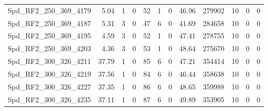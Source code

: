 \begin{longtable}[c]{@{}lrrrrrrrrrrr@{}}
Spd\_RF2\_250\_369\_4179      & 5.04                   & 1                       & 0                       & 52                     & 1                       & 0                       & 46.96                   & 279902                   & 10                       & 0                        & 0                        \\
Spd\_RF2\_250\_369\_4187      & 5.31                   & 3                       & 0                       & 47                     & 6                       & 0                       & 41.69                   & 284658                   & 10                       & 0                        & 0                        \\
Spd\_RF2\_250\_369\_4195      & 4.59                   & 3                       & 0                       & 52                     & 1                       & 0                       & 47.41                   & 278755                   & 10                       & 0                        & 0                        \\
Spd\_RF2\_250\_369\_4203      & 4.36                   & 3                       & 0                       & 53                     & 1                       & 0                       & 48.64                   & 275670                   & 10                       & 0                        & 0                        \\
Spd\_RF2\_300\_326\_4211      & 37.79                  & 1                       & 0                       & 85                     & 6                       & 0                       & 47.21                   & 354414                   & 10                       & 0                        & 0                        \\
Spd\_RF2\_300\_326\_4219      & 37.56                  & 1                       & 0                       & 84                     & 6                       & 0                       & 46.44                   & 358638                   & 10                       & 0                        & 0                        \\
Spd\_RF2\_300\_326\_4227      & 37.35                  & 1                       & 0                       & 86                     & 6                       & 0                       & 48.65                   & 359988                   & 10                       & 0                        & 0                        \\
Spd\_RF2\_300\_326\_4235      & 37.11                  & 1                       & 0                       & 87                     & 6                       & 0                       & 49.89                   & 353905                   & 10                       & 0                        & 0                        \\

\end{longtable}
